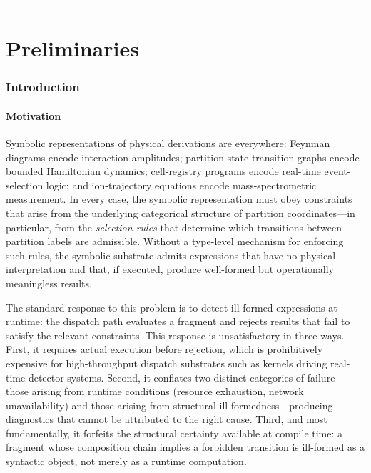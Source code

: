 \documentclass[twocolumn,11pt,a4paper]{article}
\begin{document}
\tableofcontents

\vspace{6pt}
\hrule
\vspace{6pt}

\part{Preliminaries}

\section{Introduction}
\label{sec:intro}

\subsection{Motivation}

Symbolic representations of physical derivations are everywhere: Feynman diagrams encode interaction amplitudes; partition-state transition graphs encode bounded Hamiltonian dynamics; cell-registry programs encode real-time event-selection logic; and ion-trajectory equations encode mass-spectrometric measurement. In every case, the symbolic representation must obey constraints that arise from the underlying categorical structure of partition coordinates---in particular, from the \emph{selection rules} that determine which transitions between partition labels are admissible. Without a type-level mechanism for enforcing such rules, the symbolic substrate admits expressions that have no physical interpretation and that, if executed, produce well-formed but operationally meaningless results.

The standard response to this problem is to detect ill-formed expressions at runtime: the dispatch path evaluates a fragment and rejects results that fail to satisfy the relevant constraints. This response is unsatisfactory in three ways. First, it requires actual execution before rejection, which is prohibitively expensive for high-throughput dispatch substrates such as kernels driving real-time detector systems. Second, it conflates two distinct categories of failure---those arising from runtime conditions (resource exhaustion, network unavailability) and those arising from structural ill-formedness---producing diagnostics that cannot be attributed to the right cause. Third, and most fundamentally, it forfeits the structural certainty available at compile time: a fragment whose composition chain implies a forbidden transition is ill-formed as a syntactic object, not merely as a runtime computation.
\end{document}

